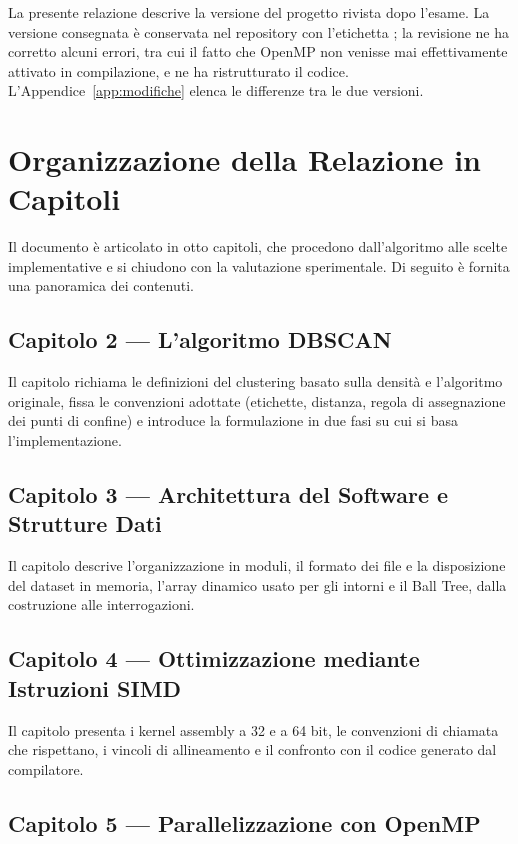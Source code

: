 La presente relazione descrive la versione del progetto rivista dopo l'esame. La versione consegnata è conservata nel repository con l'etichetta ; la revisione ne ha corretto alcuni errori, tra cui il fatto che OpenMP non venisse mai effettivamente attivato in compilazione, e ne ha ristrutturato il codice. L'Appendice~\ref{app:modifiche} elenca le differenze tra le due versioni.

\section{Organizzazione della Relazione in Capitoli}

Il documento è articolato in otto capitoli, che procedono dall'algoritmo alle scelte implementative e si chiudono con la valutazione sperimentale. Di seguito è fornita una panoramica dei contenuti.

\subsection*{Capitolo 2 --- L'algoritmo DBSCAN}

Il capitolo richiama le definizioni del clustering basato sulla densità e l'algoritmo originale, fissa le convenzioni adottate (etichette, distanza, regola di assegnazione dei punti di confine) e introduce la formulazione in due fasi su cui si basa l'implementazione.

\subsection*{Capitolo 3 --- Architettura del Software e Strutture Dati}

Il capitolo descrive l'organizzazione in moduli, il formato dei file e la disposizione del dataset in memoria, l'array dinamico usato per gli intorni e il Ball Tree, dalla costruzione alle interrogazioni.

\subsection*{Capitolo 4 --- Ottimizzazione mediante Istruzioni SIMD}

Il capitolo presenta i kernel assembly a 32 e a 64 bit, le convenzioni di chiamata che rispettano, i vincoli di allineamento e il confronto con il codice generato dal compilatore.

\subsection*{Capitolo 5 --- Parallelizzazione con OpenMP}

